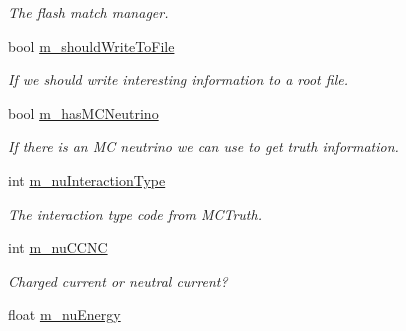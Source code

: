 \begin{DoxyCompactItemize}
\begin{DoxyCompactList}\small\item\em The flash match manager. \end{DoxyCompactList}\item 
bool \hyperlink{classflashmatch_1_1FlashMatchingTool_a4463e9c421fa26d464b037b125e0a11d}{m\+\_\+should\+Write\+To\+File}\hypertarget{classflashmatch_1_1FlashMatchingTool_a4463e9c421fa26d464b037b125e0a11d}{}\label{classflashmatch_1_1FlashMatchingTool_a4463e9c421fa26d464b037b125e0a11d}

\begin{DoxyCompactList}\small\item\em If we should write interesting information to a root file. \end{DoxyCompactList}\item 
bool \hyperlink{classflashmatch_1_1FlashMatchingTool_a6a48a0c7ba51c6383080aec264c41ea0}{m\+\_\+has\+M\+C\+Neutrino}\hypertarget{classflashmatch_1_1FlashMatchingTool_a6a48a0c7ba51c6383080aec264c41ea0}{}\label{classflashmatch_1_1FlashMatchingTool_a6a48a0c7ba51c6383080aec264c41ea0}

\begin{DoxyCompactList}\small\item\em If there is an MC neutrino we can use to get truth information. \end{DoxyCompactList}\item 
int \hyperlink{classflashmatch_1_1FlashMatchingTool_af55fe95515811281eaabe0b127b73e10}{m\+\_\+nu\+Interaction\+Type}\hypertarget{classflashmatch_1_1FlashMatchingTool_af55fe95515811281eaabe0b127b73e10}{}\label{classflashmatch_1_1FlashMatchingTool_af55fe95515811281eaabe0b127b73e10}

\begin{DoxyCompactList}\small\item\em The interaction type code from M\+C\+Truth. \end{DoxyCompactList}\item 
int \hyperlink{classflashmatch_1_1FlashMatchingTool_af149140ded5d54d8a16d57bcb7bcef9f}{m\+\_\+nu\+C\+C\+NC}\hypertarget{classflashmatch_1_1FlashMatchingTool_af149140ded5d54d8a16d57bcb7bcef9f}{}\label{classflashmatch_1_1FlashMatchingTool_af149140ded5d54d8a16d57bcb7bcef9f}

\begin{DoxyCompactList}\small\item\em Charged current or neutral current? \end{DoxyCompactList}\item 
float \hyperlink{classflashmatch_1_1FlashMatchingTool_a8fd18741587d821f70572d0accc70def}{m\+\_\+nu\+Energy}\hypertarget{classflashmatch_1_1FlashMatchingTool_a8fd18741587d821f70572d0accc70def}{}\label{classflashmatch_1_1FlashMatchingTool_a8fd18741587d821f70572d0accc70def}


\end{DoxyCompactItemize}
